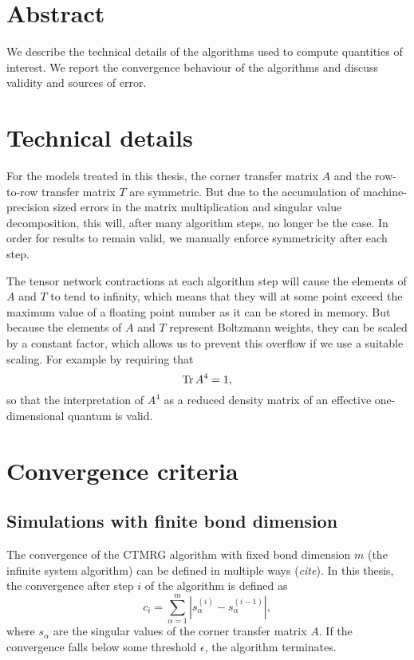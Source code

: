 \section{Abstract}

We describe the technical details of the algorithms used to compute quantities of interest.
We report the convergence behaviour of the algorithms and discuss validity and sources of error.

\section{Technical details}
For the models treated in this thesis, the corner transfer matrix $A$ and the row-to-row transfer matrix $T$ are
symmetric. But due to the accumulation of machine-precision sized errors in the matrix multiplication and singular value
decomposition, this will, after many algorithm steps, no longer be the case. In order for results to remain valid, we
manually enforce symmetricity after each step.

The tensor network contractions at each algorithm step will cause the elements of $A$ and $T$ to tend to infinity, which
means that they will at some point exceed the maximum value of a floating point number as it can be stored in memory.
But because the elements of $A$ and $T$ represent Boltzmann weights, they can be scaled by a constant factor, which
allows us to prevent this overflow if we use a suitable scaling. For example by requiring that
\begin{equation}
  \operatorname{Tr} A^4 = 1,
\end{equation}
so that the interpretation of $A^4$ as a reduced density matrix of an effective one-dimensional quantum is valid.

\section{Convergence criteria}

\subsection{Simulations with finite bond dimension}
The convergence of the CTMRG algorithm with fixed bond dimension $m$ (the infinite system algorithm) can be defined
in multiple ways (\emph{cite}). In this thesis, the convergence after step $i$ of the algorithm is defined as
\begin{equation}\label{eq:convergence}
  c_i = \sum_{\alpha = 1}^{m} | s_{\alpha}^{(i)} - s_{\alpha}^{(i - 1)} |,
\end{equation}
where $s_{\alpha}$ are the singular values of the corner transfer matrix $A$. If the convergence falls below some
threshold $\epsilon$, the algorithm terminates.

